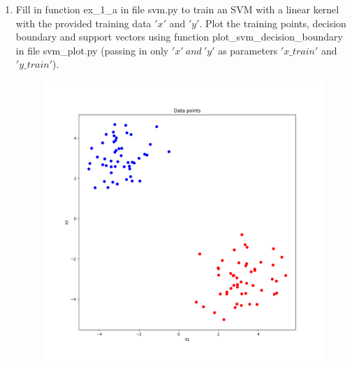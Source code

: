 \documentclass[a4paper]{article}
\begin{document}
\begin{enumerate}[label=(\alph*)]
\item Fill in function ex\_1\_a in file svm.py to train an SVM with a linear kernel with the provided training data $'x'$ and $'y'$. Plot the training points, decision boundary and support vectors using function plot\_svm\_decision\_boundary in file svm\_plot.py (passing in only $'x'~and~'y'$ as parameters $'x\_train'$ and $'y\_train'$).

\begin{figure}[htp]
\centering
\begin{minipage}{0.4\textwidth}
  \includegraphics[scale=0.25]{plots/ex1.png}
  \label{fig:1}
\end{minipage}
\hfill
\begin{minipage}{0.4\textwidth}

\end{minipage}
\end{figure}
\end{enumerate}
\end{document}
